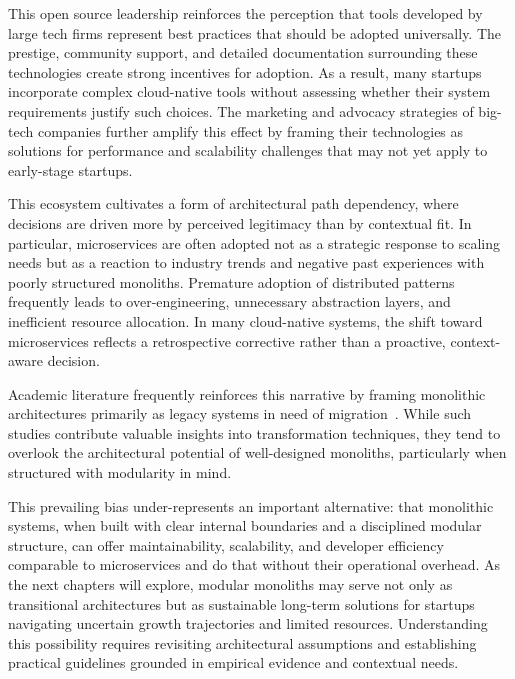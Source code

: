 This open source leadership reinforces the perception that tools developed by large tech firms represent best practices that should be adopted universally. The prestige, community support, and detailed documentation surrounding these technologies create strong incentives for adoption. As a result, many startups incorporate complex cloud-native tools without assessing whether their system requirements justify such choices. The marketing and advocacy strategies of big-tech companies further amplify this effect by framing their technologies as solutions for performance and scalability challenges that may not yet apply to early-stage startups.

This ecosystem cultivates a form of architectural path dependency, where decisions are driven more by perceived legitimacy than by contextual fit. In particular, microservices are often adopted not as a strategic response to scaling needs but as a reaction to industry trends and negative past experiences with poorly structured monoliths. Premature adoption of distributed patterns frequently leads to over-engineering, unnecessary abstraction layers, and inefficient resource allocation. In many cloud-native systems, the shift toward microservices reflects a retrospective corrective rather than a proactive, context-aware decision.

Academic literature frequently reinforces this narrative by framing monolithic architectures primarily as legacy systems in need of migration~\cite{fritzsch2019, kazanavicius2019, jin2021}. While such studies contribute valuable insights into transformation techniques, they tend to overlook the architectural potential of well-designed monoliths, particularly when structured with modularity in mind.

This prevailing bias under-represents an important alternative: that monolithic systems, when built with clear internal boundaries and a disciplined modular structure, can offer maintainability, scalability, and developer efficiency comparable to microservices and do that without their operational overhead. As the next chapters will explore, modular monoliths may serve not only as transitional architectures but as sustainable long-term solutions for startups navigating uncertain growth trajectories and limited resources. Understanding this possibility requires revisiting architectural assumptions and establishing practical guidelines grounded in empirical evidence and contextual needs.

